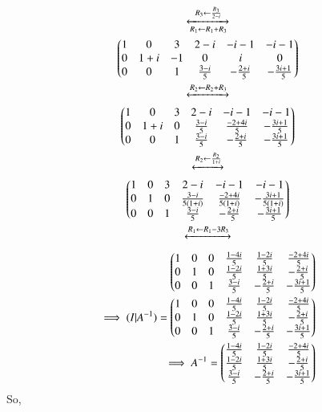 \begin{multline}
\xleftrightarrow[R_1\leftarrow R_1+R_3]{R_3\leftarrow\frac{R_3}{2-i}}\\
\begin{pmatrix}1 & 0 & 3 & 2-i & -i-1 & -i-1\\0 & 1+i & -1 & 0 & i & 0\\0 & 0 & 1 & \frac{3-i}{5} & -\frac{2+i}{5} & -\frac{3i+1}{5}\end{pmatrix}\\
\xleftrightarrow[]{R_2\leftarrow R_2+R_3}\\
\begin{pmatrix}1 & 0 & 3 & 2-i & -i-1 & -i-1\\0 & 1+i & 0 & \frac{3-i}{5} & \frac{-2+4i}{5} & -\frac{3i+1}{5}\\0 & 0 & 1 & \frac{3-i}{5} & -\frac{2+i}{5} & -\frac{3i+1}{5}\end{pmatrix}\\
\xleftrightarrow[]{R_2\leftarrow \frac{R_2}{1+i}}\\
\begin{pmatrix}1 & 0 & 3 & 2-i & -i-1 & -i-1\\0 & 1 & 0 & \frac{3-i}{5(1+i)} & \frac{-2+4i}{5(1+i)} & -\frac{3i+1}{5(1+i)}\\0 & 0 & 1 & \frac{3-i}{5} & -\frac{2+i}{5} & -\frac{3i+1}{5}\end{pmatrix}\\
\xleftrightarrow[]{R_1\leftarrow R_1-3R_3}\\
\end{multline}
\begin{align}
\begin{pmatrix}1 & 0 & 0 & \frac{1-4i}{5} & \frac{1-2i}{5} & \frac{-2+4i}{5}\\0 & 1 & 0 & \frac{1-2i}{5} & \frac{1+3i}{5} & -\frac{2+i}{5}\\0 & 0 & 1 & \frac{3-i}{5} & -\frac{2+i}{5} & -\frac{3i+1}{5}\end{pmatrix}\\
\implies (I|A^{-1}) = \begin{pmatrix}1 & 0 & 0 & \frac{1-4i}{5} & \frac{1-2i}{5} & \frac{-2+4i}{5}\\0 & 1 & 0 & \frac{1-2i}{5} & \frac{1+3i}{5} & -\frac{2+i}{5}\\0 & 0 & 1 & \frac{3-i}{5} & -\frac{2+i}{5} & -\frac{3i+1}{5}\end{pmatrix}\\
\implies A^{-1}=\begin{pmatrix}\frac{1-4i}{5} & \frac{1-2i}{5} & \frac{-2+4i}{5}\\\frac{1-2i}{5} & \frac{1+3i}{5} & -\frac{2+i}{5}\\\frac{3-i}{5} & -\frac{2+i}{5} & -\frac{3i+1}{5}\end{pmatrix}
\end{align}
 So,
